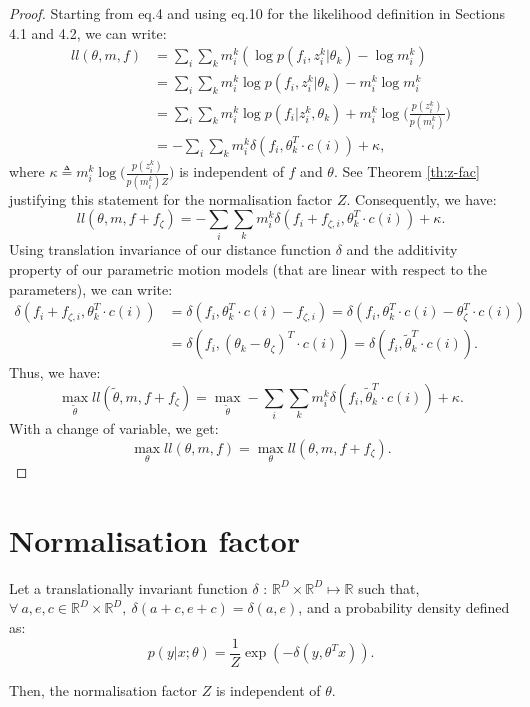 \documentclass[10pt,twocolumn,letterpaper]{article}
\begin{document}
\begin{proof}

Starting from eq.4 and using eq.10 for the likelihood definition in Sections 4.1 and 4.2, we can write: 
\begin{align*}
ll(\theta, m, f) &= \sum_i \sum_k  m_i^k  (\log p(f_i, z_i^k | \theta_k) - \log m_i^k) \\
&= \sum_i \sum_k  m_i^k  \log p(f_i, z_i^k | \theta_k) - m_i^k  \log m_i^k \\
&= \sum_i \sum_k  m_i^k  \log p(f_i | z_i^k, \theta_k) + m_i^k \log \bigg(\frac {p(z_i^k)}{p(m_i^k)}\bigg)\\
&= - \sum_i \sum_k  m_i^k \delta(f_i, \theta_k^T \cdot c(i))  + \kappa,
\end{align*}
where $\kappa \triangleq m_i^k \log \bigg(\frac {p(z_i^k)}{p(m_i^k)Z} \bigg)$ is independent of $f$ and $\theta$. See Theorem \ref{th:z-fac} justifying this statement for the normalisation factor $Z$. Consequently, we have: 
$$
ll(\theta, m, f+f_{\zeta}) = - \sum_i \sum_k  m_i^k \delta(f_i + f_{\zeta,i}, \theta_k^T \cdot c(i))  + \kappa.
$$
Using translation invariance of our distance function $\delta$ and the additivity property of our parametric motion models (that are linear with respect to the parameters), we can write: 
\begin{align*}
\delta(f_i + f_{\zeta,i}, \theta_k^T \cdot c(i)) &= \delta(f_i, \theta_k^T \cdot c(i) - f_{\zeta,i}) = \delta(f_i, \theta_k^T \cdot c(i) - \theta_{\zeta}^T \cdot c(i)) \\&= \delta(f_i, (\theta_k - \theta_{\zeta})^T \cdot c(i))  = \delta(f_i, \tilde \theta_{k}^T \cdot c(i)).
\end{align*}
Thus, we have: 
$$
\max_{\tilde  \theta} ll(\tilde  \theta, m, f+f_{\zeta}) = \max_{\tilde  \theta} - \sum_i \sum_k  m_i^k \delta(f_i, \tilde \theta_{k}^T \cdot c(i)) + \kappa.
$$
With a change of variable, we get: 
$$
\max_{\theta} ll(\theta, m, f) = \max_{\theta} ll(\theta, m, f +f_{\zeta}).
$$

\end{proof}



\section{Normalisation factor}

\begin{theorem}\label{th:z-fac}
Let a translationally invariant function $\delta$ : $\mathbb{R}^{D} \times \mathbb{R}^D \mapsto \mathbb{R} $ such that, $\forall\ a, e, c \in \mathbb{R}^{D} \times \mathbb{R}^D, \ \delta(a+c, e+c) = \delta(a,e)$, and a probability density defined as: 
$$p(y |x; \theta) = \frac1Z \exp(-\delta(y, \theta^Tx)).$$

Then, the normalisation factor $Z$ is independent of $\theta$.
\end{theorem}
\end{document}
